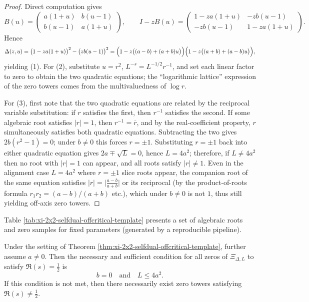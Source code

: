 \begin{proof}
Direct computation gives
\[
B(u)=\begin{pmatrix}a(1+u)&b(u-1)\\ b(u-1)&a(1+u)\end{pmatrix},
\qquad
I-zB(u)=
\begin{pmatrix}1-za(1+u)&-zb(u-1)\\ -zb(u-1)&1-za(1+u)\end{pmatrix}.
\]
Hence
\[
\Delta(z,u)
=\bigl(1-za(1+u)\bigr)^2-\bigl(zb(u-1)\bigr)^2
=\Bigl(1-z\bigl((a-b)+(a+b)u\bigr)\Bigr)\Bigl(1-z\bigl((a+b)+(a-b)u\bigr)\Bigr),
\]
yielding (1).
For (2), substitute \(u=r^2\), \(L^{-s}=L^{-1/2}r^{-1}\), and set each linear factor to zero to obtain the two quadratic equations;
the ``logarithmic lattice'' expression of the zero towers comes from the multivaluedness of \(\log r\).
\par
For (3), first note that the two quadratic equations are related by the reciprocal variable substitution: if \(r\) satisfies the first, then \(r^{-1}\) satisfies the second.
If some algebraic root satisfies \(|r|=1\), then \(r^{-1}=\overline r\), and by the real-coefficient property, \(r\) simultaneously satisfies both quadratic equations.
Subtracting the two gives \(2b(r^2-1)=0\); under \(b\neq 0\) this forces \(r=\pm 1\).
Substituting \(r=\pm 1\) back into either quadratic equation gives \(2a\mp\sqrt L=0\), hence \(L=4a^2\);
therefore, if \(L\neq 4a^2\) then no root with \(|r|=1\) can appear, and all roots satisfy \(|r|\neq 1\).
Even in the alignment case \(L=4a^2\) where \(r=\pm 1\) slice roots appear, the companion root of the same equation satisfies
\(
|r|=\bigl|\frac{a-b}{a+b}\bigr|
\)
or its reciprocal (by the product-of-roots formula \(r_1r_2=(a-b)/(a+b)\) etc.), which under \(b\neq 0\) is not \(1\), thus still yielding off-axis zero towers.
\qedhere
\end{proof}

Table \ref{tab:xi-2x2-selfdual-offcritical-template} presents a set of algebraic roots and zero samples for fixed parameters (generated by a reproducible pipeline).


\begin{corollary}\label{cor:xi-2x2-selfdual-slice-purity-iff}
Under the setting of Theorem \ref{thm:xi-2x2-selfdual-offcritical-template}, further assume \(a\neq 0\).
Then the necessary and sufficient condition for all zeros of \(\Xi_{\Delta,L}\) to satisfy \(\Re(s)=\tfrac12\) is
\[
b=0\quad\text{and}\quad L\le 4a^2.
\]
If this condition is not met, then there necessarily exist zero towers satisfying \(\Re(s)\neq\tfrac12\).
\end{corollary}

